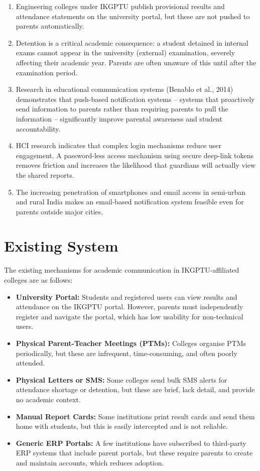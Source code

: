 \documentclass[12pt,a4paper]{report}
\begin{document}
\begin{enumerate}
  \item Engineering colleges under IKGPTU publish provisional results and attendance statements on the university portal, but these are not pushed to parents automatically.
  \item Detention is a critical academic consequence: a student detained in internal exams cannot appear in the university (external) examination, severely affecting their academic year. Parents are often unaware of this until after the examination period.
  \item Research in educational communication systems (Benablo et al., 2014) demonstrates that push-based notification systems -- systems that proactively send information to parents rather than requiring parents to pull the information -- significantly improve parental awareness and student accountability.
  \item HCI research indicates that complex login mechanisms reduce user engagement. A password-less access mechanism using secure deep-link tokens removes friction and increases the likelihood that guardians will actually view the shared reports.
  \item The increasing penetration of smartphones and email access in semi-urban and rural India makes an email-based notification system feasible even for parents outside major cities.
\end{enumerate}

\section{Existing System}
The existing mechanisms for academic communication in IKGPTU-affiliated colleges are as follows:

\begin{itemize}
  \item \textbf{University Portal:} Students and registered users can view results and attendance on the IKGPTU portal. However, parents must independently register and navigate the portal, which has low usability for non-technical users.
  \item \textbf{Physical Parent-Teacher Meetings (PTMs):} Colleges organise PTMs periodically, but these are infrequent, time-consuming, and often poorly attended.
  \item \textbf{Physical Letters or SMS:} Some colleges send bulk SMS alerts for attendance shortage or detention, but these are brief, lack detail, and provide no academic context.
  \item \textbf{Manual Report Cards:} Some institutions print result cards and send them home with students, but this is easily intercepted and is not reliable.
  \item \textbf{Generic ERP Portals:} A few institutions have subscribed to third-party ERP systems that include parent portals, but these require parents to create and maintain accounts, which reduces adoption.
\end{itemize}
\end{document}
